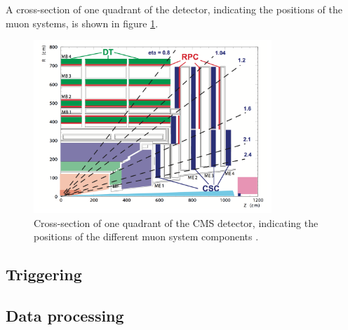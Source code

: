 A cross-section of one quadrant of the detector, indicating
the positions of the muon systems, is shown in figure \ref{fig:CMS_MuonSystem}.
\begin{figure}[h!]
\begin{center}
\includegraphics[width=0.8\textwidth]{./Detector/Plots/MuonSystem.png}
\caption{Cross-section of one quadrant of the CMS detector, indicating
the positions of the different muon system components \cite{cms-tdr-vol1}.}
\label{fig:CMS_MuonSystem}
\end{center}
\end{figure}

\subsection{Triggering}
\label{sec:CMSLHC_CMS_trigger}

\subsection{Data processing}
\label{sec:CMSLHC_CMS_dataproc}

